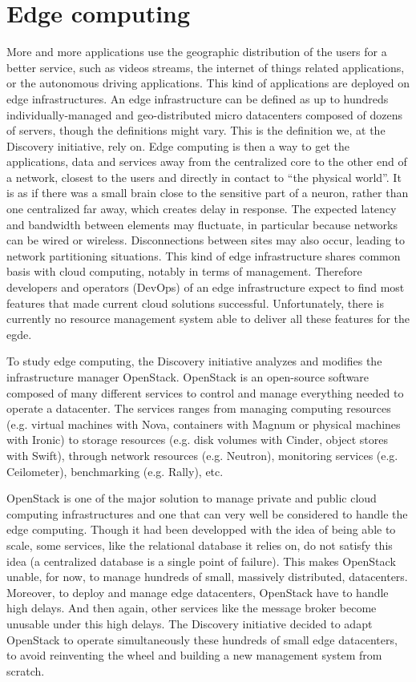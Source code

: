 \section{Edge computing}

More and more applications use the geographic distribution of the users for a better service, such as videos streams, the internet of things related applications, or the autonomous driving applications. This kind of applications are deployed on edge infrastructures. An edge infrastructure can be defined as up to hundreds individually-managed and geo-distributed micro datacenters composed of dozens of servers, though the definitions might vary. This is the definition we, at the Discovery initiative, rely on. Edge computing is then a way to get the applications, data and services away from the centralized core to the other end of a network, closest to the users and directly in contact to ``the physical world''. It is as if there was a small brain close to the sensitive part of a neuron, rather than one centralized far away, which creates delay in response. The expected latency and bandwidth between elements may fluctuate, in particular because networks can be wired or wireless. Disconnections between sites may also occur, leading to network partitioning situations. This kind of edge infrastructure shares common basis with cloud computing, notably in terms of management. Therefore developers and operators (DevOps) of an edge infrastructure expect to find most features that made current cloud solutions successful. Unfortunately, there is currently no resource management system able to deliver all these features for the egde.

To study edge computing, the Discovery initiative analyzes and modifies the infrastructure manager OpenStack. OpenStack is an open-source software composed of many different services to control and manage everything needed to operate a datacenter. The services ranges from managing computing resources (e.g. virtual machines with Nova, containers with Magnum or physical machines with Ironic) to storage resources (e.g. disk volumes with Cinder, object stores with Swift), through network resources (e.g. Neutron), monitoring services (e.g. Ceilometer), benchmarking (e.g. Rally), etc.

OpenStack is one of the major solution to manage private and public cloud computing infrastructures and one that can very well be considered to handle the edge computing. Though it had been developped with the idea of being able to scale, some services, like the relational database it relies on, do not satisfy this idea (a centralized database is a single point of failure). This makes OpenStack unable, for now, to manage hundreds of small, massively distributed, datacenters. Moreover, to deploy and manage edge datacenters, OpenStack have to handle high delays. And then again, other services like the message broker become unusable under this high delays. The Discovery initiative decided to adapt OpenStack to operate simultaneously these hundreds of small edge datacenters, to avoid reinventing the wheel and building a new management system from scratch.

